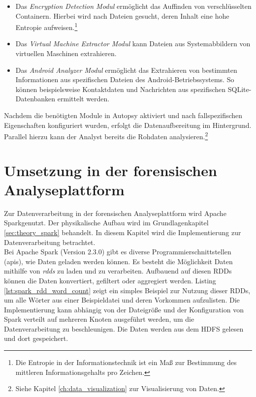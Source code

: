 \begin{itemize}
\item Das \textit{Encryption Detection Modul} ermöglicht das Auffinden von verschlüsselten Containern. Hierbei wird nach Dateien gesucht, deren Inhalt eine hohe Entropie aufweisen.\footnote{Die Entropie in der Informationstechnik ist ein Maß zur Bestimmung des mittleren Informationsgehalts pro Zeichen. 
}
\item Das \textit{Virtual Machine Extractor Modul} kann Dateien aus Systemabbildern von virtuellen Maschinen extrahieren.
\item Das \textit{Android Analyzer Modul} ermöglicht das Extrahieren von bestimmten Informationen aus spezifischen Dateien des Android-Betriebssystems. So können beispielsweise Kontaktdaten und Nachrichten aus spezifischen SQLite-Datenbanken ermittelt werden.
\end{itemize}

\noindent
Nachdem die benötigten Module in Autopsy aktiviert und nach fallspezifischen Eigenschaften konfiguriert wurden, erfolgt die Datenaufbereitung im Hintergrund. Parallel hierzu kann der Analyst bereits die Rohdaten analysieren.\footnote{Siehe Kapitel \ref{ch:data_visualization} zur Visualisierung von Daten.}\\

\section{Umsetzung in der forensischen Analyseplattform}

Zur Datenverarbeitung in der forensischen Analyseplattform wird Apache Spark\texttrademark\thinspace genutzt. Der physikalische Aufbau wird im Grundlagenkapitel \ref{sec:theory_spark} behandelt. In diesem Kapitel wird die Implementierung zur Datenverarbeitung betrachtet.\\ 

\noindent
Bei Apache Spark (Version 2.3.0) gibt es diverse Programmierschnittstellen (\acrshort{api}s), wie Daten geladen werden können. Es besteht die Möglichkeit Daten mithilfe von \textit{\glspl{rdd}} zu laden und zu verarbeiten. Aufbauend auf diesen RDDs können die Daten konvertiert, gefiltert oder aggregiert werden.
Listing \ref{lst:spark_rdd_word_count} zeigt ein simples Beispiel zur Nutzung dieser RDDs, um alle Wörter aus einer Beispieldatei  und deren Vorkommen aufzulisten. Die Implementierung kann abhängig von der Dateigröße und der Konfiguration von Spark verteilt auf mehreren Knoten ausgeführt werden, um die Datenverarbeitung zu beschleunigen. Die Daten werden aus dem HDFS gelesen und dort gespeichert.

